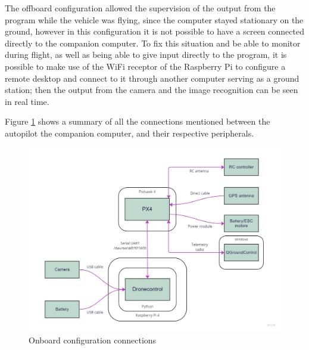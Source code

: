 The offboard configuration allowed the supervision of the output from the program while the vehicle was flying, since the computer stayed stationary on the ground, however in this configuration it is not possible to have a screen connected directly to the companion computer.
To fix this situation and be able to monitor during flight, as well as being able to give input directly to the program, it is possible to make use of the WiFi receptor of the Raspberry Pi to configure a remote desktop and connect to it through another computer serving as a ground station;
then the output from the camera and the image recognition can be seen in real time.

Figure \ref{fig:onboard-config} shows a summary of all the connections mentioned between the autopilot the companion computer, and their respective peripherals.

\begin{figure}
  \centering
  \includegraphics[width=\textwidth,keepaspectratio]{img/onboard-diagram.jpg}
  \caption{Onboard configuration connections}
  \label{fig:onboard-config}
\end{figure}
